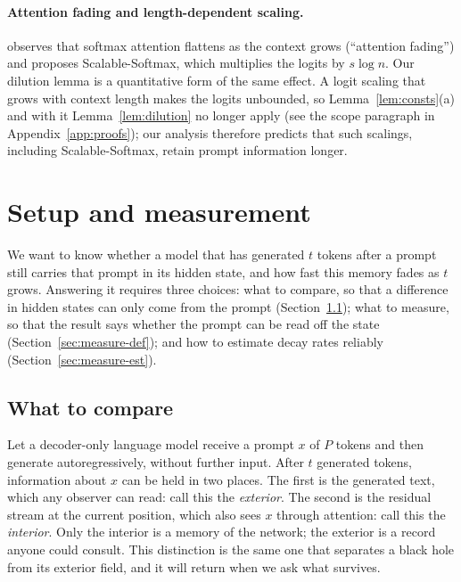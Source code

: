 \documentclass[11pt]{article}
\theoremstyle{definition}
\theoremstyle{remark}
\begin{document}
\paragraph{Attention fading and length-dependent scaling.} \citet{nakanishi2025ssmax} observes that softmax attention flattens as the context grows (``attention fading'') and proposes Scalable-Softmax, which multiplies the logits by $s\log n$. Our dilution lemma is a quantitative form of the same effect. A logit scaling that grows with context length makes the logits unbounded, so Lemma~\ref{lem:consts}(a) and with it Lemma~\ref{lem:dilution} no longer apply (see the scope paragraph in Appendix~\ref{app:proofs}); our analysis therefore predicts that such scalings, including Scalable-Softmax, retain prompt information longer.

\section{Setup and measurement}
\label{sec:measure}

We want to know whether a model that has generated $t$
tokens after a prompt still carries that prompt in its hidden state, and how fast this memory fades as $t$
 grows. Answering it requires three choices: what to compare, so that a difference in hidden states can only come from the prompt (Section~\ref{sec:measure-setting}); what to measure, so that the result says whether the prompt can be read off the state (Section~\ref{sec:measure-def}); and how to estimate decay rates reliably (Section~\ref{sec:measure-est}). 

\subsection{What to compare}\label{sec:measure-setting}

Let a decoder-only language model receive a prompt $x$ of $P$ tokens and then generate autoregressively, without further input. After $t$ generated tokens, information about $x$ can be held in two places. The first is the generated text, which any observer can read: call this the \emph{exterior}. The second is the residual stream at the current position, which also sees $x$ through attention: call this the \emph{interior}. Only the interior is a memory of the network; the exterior is a record anyone could consult. This distinction is the same one that separates a black hole from its exterior field, and it will return when we ask what survives.
\end{document}

